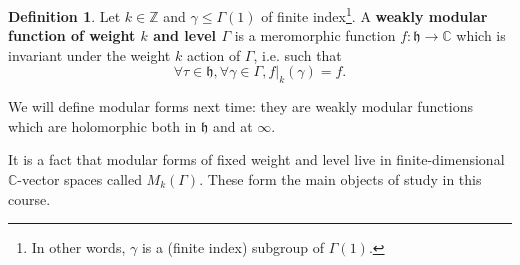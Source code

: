 \documentclass{article}
\theoremstyle{definition}
\newtheorem{defn}{Definition}[section]
\begin{document}
\begin{defn}
    Let $k \in \mathbb{Z}$ and $\gamma \le \Gamma(1)$ of finite index\footnote{In other words, $\gamma$ is a (finite index) subgroup of $\Gamma(1)$.}. A \textbf{weakly modular function of weight $k$ and level $\Gamma$} is a meromorphic function $f : \mathfrak{h} \to \mathbb{C}$ which is invariant under the weight $k$ action of $\Gamma$, i.e. such that $$\forall \tau \in \mathfrak{h}, \forall \gamma \in \Gamma, f|_k(\gamma) = f.$$
\end{defn}
We will define modular forms next time: they are weakly modular functions which are holomorphic both in $\mathfrak{h}$ and at $\infty$.
\vspace{1mm}
 
It is a fact that modular forms of fixed weight and level live in finite-dimensional $\mathbb{C}$-vector spaces called $M_k(\Gamma)$. These form the main objects of study in this course.
\vspace{1mm}
 
\end{document}
